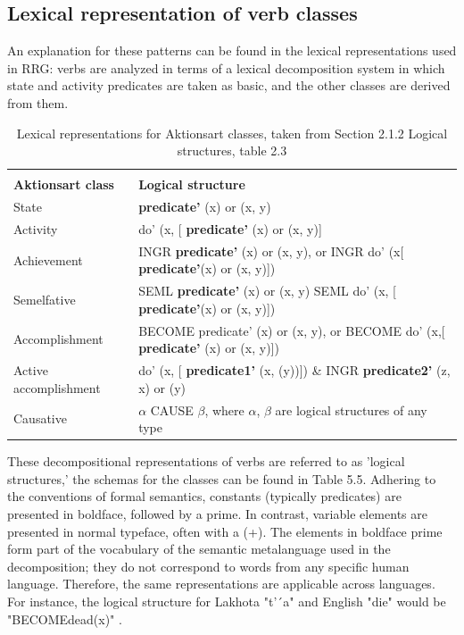 \subsection{Lexical representation of verb classes}

An explanation for these patterns can be found in the lexical representations used in RRG: verbs are analyzed in terms of a lexical decomposition system in which state and activity predicates are taken as basic, and the other classes are derived from them.


\begin{table}[H]
    \centering
    \begin{tabular}{|p{3.3cm}  p{7.7cm}|}
     \hline
     \multicolumn{2}{|c|}{} \\ 
         \textbf{Aktionsart class} & \textbf{Logical structure} \\ [.3cm]
         State &  \textbf{predicate'} (x) or (x, y)  \\ [.3cm]
         Activity &  do' (x, [ \textbf{predicate'} (x) or (x, y)] \\  [.3cm]
         Achievement & INGR  \textbf{predicate'} (x) or (x, y), or INGR do' (x[ \textbf{predicate'}(x) or (x, y)])  \\ [.3cm]  
         Semelfative & SEML  \textbf{predicate'} (x) or (x, y) SEML do' (x, [ \textbf{predicate'}(x) or (x, y)]) \\  [.3cm]  
         Accomplishment & BECOME predicate' (x) or (x, y), or BECOME do' (x,[ \textbf{predicate'} (x) or (x, y)]) \\ [.3cm]  
         Active accomplishment & do' (x, [ \textbf{predicate1'} (x, (y))]) \& INGR  \textbf{predicate2'} (z, x) or (y) \\  [.3cm]  
         Causative & $\alpha$ CAUSE $\beta$, where $\alpha$, $\beta$ are logical structures of any type \\  [.3cm]
         \hline
    \end{tabular}
    \caption{Lexical representations for Aktionsart classes, taken from \textcite{van2005exploring} Section 2.1.2 Logical structures,  table 2.3}
    \label{tab:my_label}
\end{table}


These decompositional representations of verbs are referred to as 'logical structures,' the schemas for the classes can be found in Table 5.5. Adhering to the conventions of formal semantics, constants (typically predicates) are presented in boldface, followed by a prime. In contrast, variable elements are presented in normal typeface, often with a (+). The elements in boldface prime form part of the vocabulary of the semantic metalanguage used in the decomposition; they do not correspond to words from any specific human language. Therefore, the same representations are applicable across languages. For instance, the logical structure for Lakhota "t’´a" and English "die" would be "BECOMEdead(x)"  \parencite{van2005exploring}. \\


